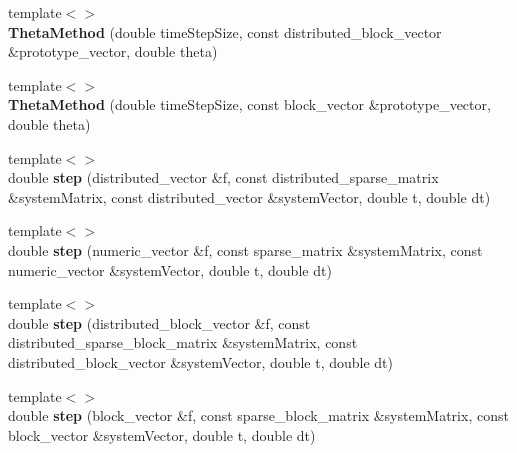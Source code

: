 \begin{DoxyCompactItemize}
\item 
\hypertarget{classnatrium_1_1ThetaMethod_ac5b08a9ab08f4f61779dc818a6dac3b2}{
{\footnotesize template$<$$>$ }\\{\bfseries ThetaMethod} (double timeStepSize, const distributed\_\-block\_\-vector \&prototype\_\-vector, double theta)}
\label{classnatrium_1_1ThetaMethod_ac5b08a9ab08f4f61779dc818a6dac3b2}

\item 
\hypertarget{classnatrium_1_1ThetaMethod_a6329a87c9fd50d6db3546b892b716b3c}{
{\footnotesize template$<$$>$ }\\{\bfseries ThetaMethod} (double timeStepSize, const block\_\-vector \&prototype\_\-vector, double theta)}
\label{classnatrium_1_1ThetaMethod_a6329a87c9fd50d6db3546b892b716b3c}

\item 
\hypertarget{classnatrium_1_1ThetaMethod_a68e1ddc84cd0ae5ee13a26333a9b5b97}{
{\footnotesize template$<$$>$ }\\double {\bfseries step} (distributed\_\-vector \&f, const distributed\_\-sparse\_\-matrix \&systemMatrix, const distributed\_\-vector \&systemVector, double t, double dt)}
\label{classnatrium_1_1ThetaMethod_a68e1ddc84cd0ae5ee13a26333a9b5b97}

\item 
\hypertarget{classnatrium_1_1ThetaMethod_a1fe9306f09ecdc50f27c7ae36c528e13}{
{\footnotesize template$<$$>$ }\\double {\bfseries step} (numeric\_\-vector \&f, const sparse\_\-matrix \&systemMatrix, const numeric\_\-vector \&systemVector, double t, double dt)}
\label{classnatrium_1_1ThetaMethod_a1fe9306f09ecdc50f27c7ae36c528e13}

\item 
\hypertarget{classnatrium_1_1ThetaMethod_a09182df9e98932d93b7e32ffdd2ae46f}{
{\footnotesize template$<$$>$ }\\double {\bfseries step} (distributed\_\-block\_\-vector \&f, const distributed\_\-sparse\_\-block\_\-matrix \&systemMatrix, const distributed\_\-block\_\-vector \&systemVector, double t, double dt)}
\label{classnatrium_1_1ThetaMethod_a09182df9e98932d93b7e32ffdd2ae46f}

\item 
\hypertarget{classnatrium_1_1ThetaMethod_a30d578fab2d0189fe2a4c51ddc29cc3a}{
{\footnotesize template$<$$>$ }\\double {\bfseries step} (block\_\-vector \&f, const sparse\_\-block\_\-matrix \&systemMatrix, const block\_\-vector \&systemVector, double t, double dt)}
\label{classnatrium_1_1ThetaMethod_a30d578fab2d0189fe2a4c51ddc29cc3a}

\end{DoxyCompactItemize}


